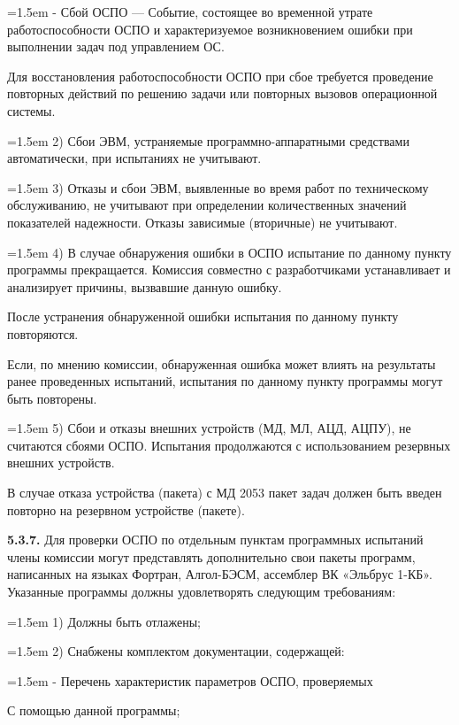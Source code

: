 \documentclass[11pt,a4paper]{article}
\begin{document}
\par\hangindent=1.5em - Сбой ОСПО --- Событие, состоящее во временной утрате работоспособности ОСПО и характеризуемое возникновением ошибки при выполнении задач под управлением ОС.\par
Для восстановления работоспособности ОСПО при сбое требуется проведение повторных действий по решению задачи или повторных вызовов операционной системы.

\par\hangindent=1.5em 2) Сбои ЭВМ, устраняемые программно-аппаратными средствами автоматически, при испытаниях не учитывают.\par
\par\hangindent=1.5em 3) Отказы и сбои ЭВМ, выявленные во время работ по техническому обслуживанию, не учитывают при определении количественных значений показателей надежности. Отказы зависимые (вторичные) не учитывают.\par
\par\hangindent=1.5em 4) В случае обнаружения ошибки в ОСПО испытание по данному пункту программы прекращается. Комиссия совместно с разработчиками устанавливает и анализирует причины, вызвавшие данную ошибку.\par
После устранения обнаруженной ошибки испытания по данному пункту повторяются.

Если, по мнению комиссии, обнаруженная ошибка может влиять на результаты ранее проведенных испытаний, испытания по данному пункту программы могут быть повторены.

\par\hangindent=1.5em 5) Сбои и отказы внешних устройств (МД, МЛ, АЦД, АЦПУ), не считаются сбоями ОСПО. Испытания продолжаются с использованием резервных внешних устройств.\par
В случае отказа устройства (пакета) с МД 2053 пакет задач должен быть введен повторно на резервном устройстве (пакете).

\par\textbf{5.3.7.} Для проверки ОСПО по отдельным пунктам программных испытаний члены комиссии могут представлять дополнительно свои пакеты программ, написанных на языках Фортран, Алгол-БЭСМ, ассемблер ВК «Эльбрус 1-КБ». Указанные программы должны удовлетворять следующим требованиям:\par
\par\hangindent=1.5em 1) Должны быть отлажены;\par
\par\hangindent=1.5em 2) Снабжены комплектом документации, содержащей:\par
\par\hangindent=1.5em - Перечень характеристик параметров ОСПО, проверяемых\par
С помощью данной программы;
\end{document}
